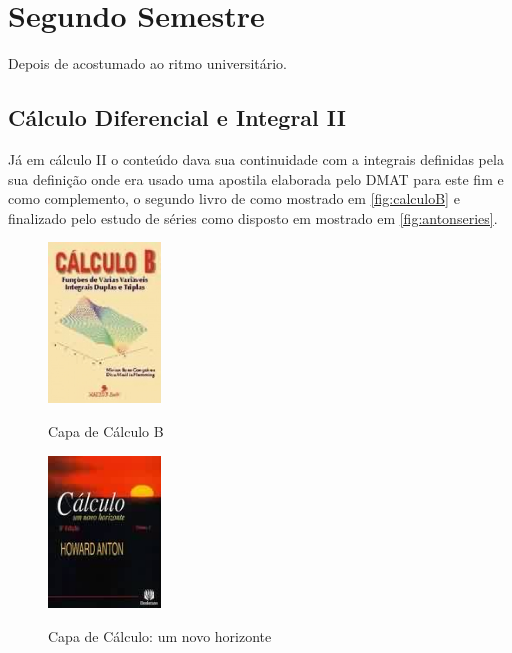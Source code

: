 \documentclass[
	12pt,				%
	openright,			%
	oneside,			%
	a4paper,			%
	english,			%
	french,				%
	spanish,			%
	brazil				%
	]{abntex2}
\begin{document}
\chapter{Segundo Semestre}\label{chap:2sem}
Depois de acostumado ao ritmo universitário.
\section{Cálculo Diferencial e Integral II}\label{sec:cdi2}
Já em cálculo II o conteúdo dava sua continuidade com a integrais definidas pela sua definição onde era usado uma apostila elaborada pelo DMAT para este fim e como complemento, o segundo livro de  como mostrado em \autoref{fig:calculoB} e finalizado pelo estudo de séries como disposto em  mostrado em \autoref{fig:antonseries}.

\begin{figure}[!htb]
	\caption{Capa de Cálculo B}
	\centering
	\includegraphics[width=3cm]{calculoB.jpg}
	\label{fig:calculoB}
\end{figure}

\begin{figure}[!htb]
	\caption{Capa de Cálculo: um novo horizonte}
	\centering
	\includegraphics[width=3cm]{antonseries.jpg}
	\label{fig:antonseries}
\end{figure}
\end{document}
